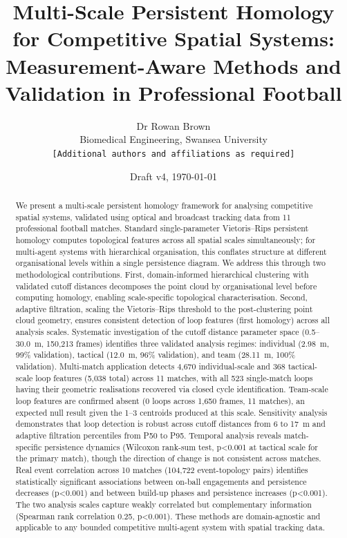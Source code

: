\documentclass[11pt,a4paper]{article}
\title{Multi-Scale Persistent Homology for Competitive Spatial Systems:\\
Measurement-Aware Methods and Validation in Professional Football}
\author{%
  Dr Rowan Brown\\
  Biomedical Engineering, Swansea University\\
  \texttt{[Additional authors and affiliations as required]}
}
\date{Draft v4, \today}
\begin{document}
\maketitle

\begin{abstract}
\noindent
We present a multi-scale persistent homology framework for analysing competitive spatial systems, validated using optical and broadcast tracking data from 11 professional football matches. Standard single-parameter Vietoris--Rips persistent homology computes topological features across all spatial scales simultaneously; for multi-agent systems with hierarchical organisation, this conflates structure at different organisational levels within a single persistence diagram. We address this through two methodological contributions. First, domain-informed hierarchical clustering with validated cutoff distances decomposes the point cloud by organisational level before computing homology, enabling scale-specific topological characterisation. Second, adaptive filtration, scaling the Vietoris--Rips threshold to the post-clustering point cloud geometry, ensures consistent detection of loop features (first homology) across all analysis scales. Systematic investigation of the cutoff distance parameter space (0.5--30.0~m, 150,213 frames) identifies three validated analysis regimes: individual (2.98~m, 99\% validation), tactical (12.0~m, 96\% validation), and team (28.11~m, 100\% validation). Multi-match application detects 4,670 individual-scale and 368 tactical-scale loop features (5,038 total) across 11 matches, with all 523 single-match loops having their geometric realisations recovered via closed cycle identification. Team-scale loop features are confirmed absent (0 loops across 1,650 frames, 11 matches), an expected null result given the 1--3 centroids produced at this scale. Sensitivity analysis demonstrates that loop detection is robust across cutoff distances from 6 to 17~m and adaptive filtration percentiles from P50 to P95. Temporal analysis reveals match-specific persistence dynamics (Wilcoxon rank-sum test, p\textless0.001 at tactical scale for the primary match), though the direction of change is not consistent across matches. Real event correlation across 10 matches (104,722 event-topology pairs) identifies statistically significant associations between on-ball engagements and persistence decreases (p\textless0.001) and between build-up phases and persistence increases (p\textless0.001). The two analysis scales capture weakly correlated but complementary information (Spearman rank correlation 0.25, p\textless0.001). These methods are domain-agnostic and applicable to any bounded competitive multi-agent system with spatial tracking data.
\end{abstract}
\end{document}

